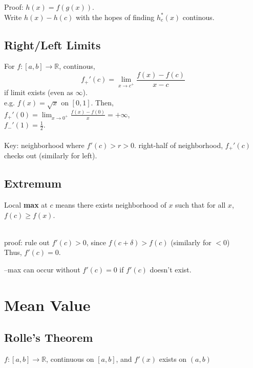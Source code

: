 \documentclass[12pt]{article}
\begin{document}
\textcolor[gray]{0.5}{
Proof: $h(x) = f(g(x))$.\\
Write $h(x) - h(c)$ with the hopes of finding $h_c^*(x)$ continous.
}

\subsection*{Right/Left Limits}
For $f: [a, b] \rightarrow \mathbb{R}$, continous, 
$$f_+'(c) = \lim_{x \rightarrow c^+} \frac{f(x) - f(c)}{x - c}$$
if limit exists (even as $\infty$).\\

e.g. $f(x) = \sqrt{x}$ on $[0, 1]$. Then, \\
$f_+'(0) = \lim_{x \rightarrow 0^+} \frac{f(x) - f(0)}{x} = +\infty$, \\
$f_-'(1) = \frac{1}{2}$.\\

\\
\textcolor[gray]{0.5}{Key: neighborhood where $f'(c) > r > 0$. 
right-half of neighborhood, $f_+'(c)$ checks out (similarly for left).}


\subsection*{Extremum}
Local \textbf{max} at $c$ means there exists neighborhood of $x$ such that for all $x$, $f(c) \geq f(x)$.\\

\centerline{} \\
\textcolor[gray]{0.5}{proof: 
rule out $f'(c) > 0$, since $f(c+\delta) > f(c)$ (similarly for $<0$)\\
Thus, $f'(c) = 0$.\\}

--max can occur without $f'(c) =0$ if $f'(c)$ doesn't exist.
\section{Mean Value}
\subsection*{Rolle's Theorem}

$f: [a, b] \rightarrow \mathbb{R}$, continuous on $[a, b]$, and $f'(x)$ exists on $(a, b)$\\
\end{document}
